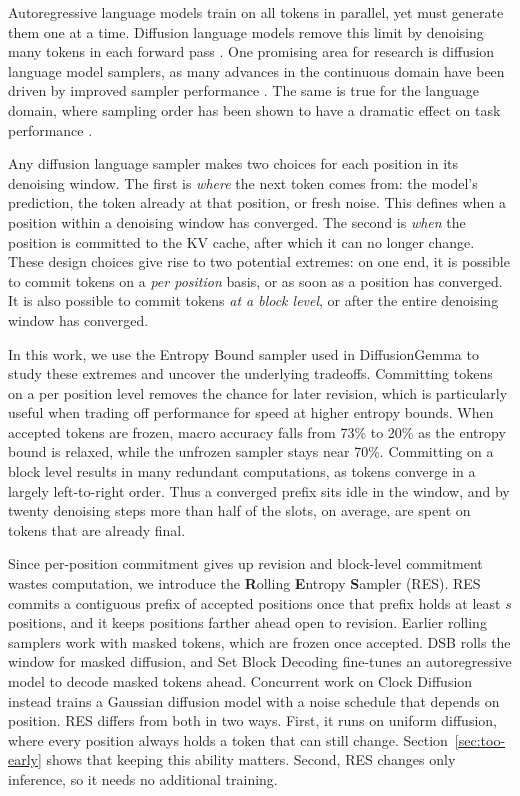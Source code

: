Autoregressive language models train on all tokens in parallel, yet must generate them one at a time.
Diffusion language models remove this limit by denoising many tokens in each forward pass \citep{nie2026large, ye2025dream7bdiffusionlarge, team2026diffusiongemma}.
One promising area for research is diffusion language model samplers, as many advances in the continuous domain have been driven by improved sampler performance \citep{song2020denoising}.
The same is true for the language domain, where sampling order has been shown to have a dramatic effect on task performance \citep{kim2025train, ben2026accelerated, kim2026klass}.

Any diffusion language sampler makes two choices for each position in its denoising window.
The first is \emph{where} the next token comes from: the model's prediction, the token already at that position, or fresh noise.
This defines when a position within a denoising window has converged.
The second is \emph{when} the position is committed to the KV cache, after which it can no longer change.
These design choices give rise to two potential extremes: on one end, it is possible to commit tokens on a \textit{per position} basis, or as soon as a position has converged.
It is also possible to commit tokens \textit{at a block level}, or after the entire denoising window has converged.

In this work, we use the Entropy Bound sampler used in DiffusionGemma \citep{team2026diffusiongemma} to study these extremes and uncover the underlying tradeoffs.
Committing tokens on a per position level removes the chance for later revision, which is particularly useful when trading off performance for speed at higher entropy bounds.
When accepted tokens are frozen, macro accuracy falls from 73\% to 20\% as the entropy bound is relaxed, while the unfrozen sampler stays near 70\%.
Committing on a block level results in many redundant computations, as tokens converge in a largely left-to-right order.
Thus a converged prefix sits idle in the window, and by twenty denoising steps more than half of the slots, on average, are spent on tokens that are already final.

Since per-position commitment gives up revision and block-level commitment wastes computation, we introduce the \textbf{R}olling \textbf{E}ntropy \textbf{S}ampler (RES).
RES commits a contiguous prefix of accepted positions once that prefix holds at least $s$ positions, and it keeps positions farther ahead open to revision.
Earlier rolling samplers work with masked tokens, which are frozen once accepted.
DSB \citep{luo2026dsb} rolls the window for masked diffusion, and Set Block Decoding \citep{gat2025set} fine-tunes an autoregressive model to decode masked tokens ahead.
Concurrent work on Clock Diffusion \citep{schiff2026clock} instead trains a Gaussian diffusion model with a noise schedule that depends on position.
RES differs from both in two ways.
First, it runs on uniform diffusion, where every position always holds a token that can still change. Section~\ref{sec:too-early} shows that keeping this ability matters.
Second, RES changes only inference, so it needs no additional training.

